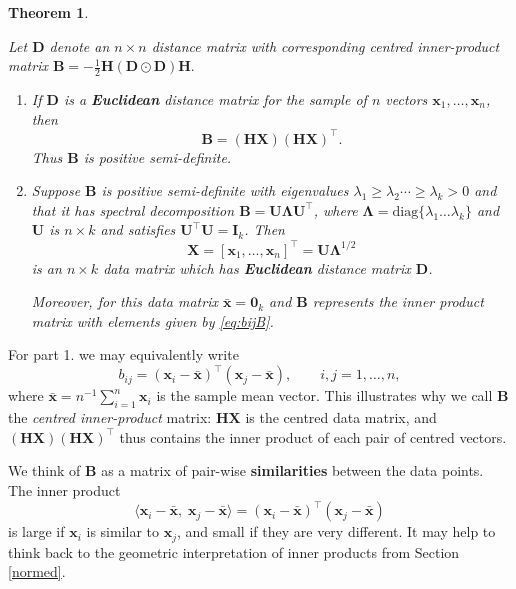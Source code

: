 \documentclass[
]{book}
\newtheorem{theorem}{Theorem}[chapter]
\theoremstyle{definition}
\theoremstyle{definition}
\theoremstyle{definition}
\theoremstyle{definition}
\theoremstyle{remark}
\begin{document}
\begin{theorem}
\protect\hypertarget{thm:five1}{}\label{thm:five1}

Let \(\mathbf D\) denote an \(n \times n\) distance matrix with corresponding centred inner-product matrix \(\mathbf B=-\frac{1}{2}\mathbf H(\mathbf D\odot\mathbf D)\mathbf H.\)

\begin{enumerate}
\def\labelenumi{\arabic{enumi}.}
\item
  If \(\mathbf D\) is a \textbf{Euclidean} distance matrix for the sample of \(n\) vectors \(\mathbf x_1,\ldots , \mathbf x_n\), then
  \begin{equation}
  \mathbf B= ({\mathbf H} {\mathbf X})({\mathbf H} {\mathbf X})^\top.
  \label{eq:bijB}
  \end{equation}
  Thus \(\mathbf B\) is positive semi-definite.
\item
  Suppose \(\mathbf B\) is positive semi-definite with eigenvalues \(\lambda_1 \geq \lambda_2 \cdots \geq \lambda_k > 0\) and that it has spectral decomposition \(\mathbf B={\mathbf U} {\pmb \Lambda}{\mathbf U}^\top\), where \({\pmb \Lambda}=\text{diag}\{\lambda_1 \ldots \lambda_k\}\) and \(\mathbf U\) is \(n \times k\) and satisfies \({\mathbf U}^\top {\mathbf U}={\mathbf I}_k\). Then
  \[{\mathbf X}=[\mathbf x_1, \ldots , \mathbf x_n]^\top={\mathbf U}{\pmb \Lambda}^{1/2}\]
  is an \(n \times k\) data matrix which has \textbf{Euclidean} distance matrix \(\mathbf D\).

  Moreover, for this data matrix \(\bar{\mathbf x}={\mathbf 0}_k\) and \(\mathbf B\) represents the inner product matrix with elements given by \eqref{eq:bijB}.
\end{enumerate}

\end{theorem}

For part 1. we may equivalently write
\begin{equation}
b_{ij}=(\mathbf x_i-\bar{\mathbf x})^\top (\mathbf x_j - \bar{\mathbf x}), \qquad i,j=1,\ldots , n,
\end{equation}
where \(\bar{\mathbf x}=n^{-1}\sum_{i=1}^n \mathbf x_i\) is the sample mean vector.
This illustrates why we call \(\mathbf B\) the \emph{centred inner-product} matrix: \(\mathbf H\mathbf X\) is the centred data matrix, and \((\mathbf H\mathbf X)(\mathbf H\mathbf X)^\top\) thus contains the inner product of each pair of centred vectors.

We think of \(\mathbf B\) as a matrix of pair-wise \textbf{similarities} between the data points. The inner product \[\langle \mathbf x_i-\bar{\mathbf x}, \;\mathbf x_j - \bar{\mathbf x} \rangle=(\mathbf x_i-\bar{\mathbf x})^\top (\mathbf x_j - \bar{\mathbf x})\] is large if \(\mathbf x_i\) is similar to \(\mathbf x_j\), and small if they are very different. It may help to think back to the geometric interpretation of inner products from Section \ref{normed}.
\end{document}
